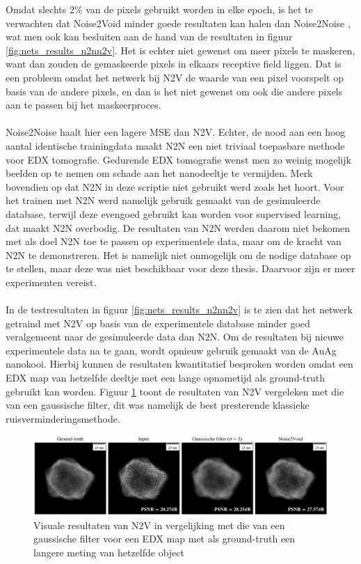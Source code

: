 \documentclass{report}
\begin{document}
Omdat slechts $2\%$ van de pixels gebruikt worden in elke epoch, is het te verwachten dat Noise2Void minder goede resultaten kan halen dan Noise2Noise \cite{paper:n2v}, wat men ook kan besluiten aan de hand van de resultaten in figuur \ref{fig:nets_results_n2nn2v}. Het is echter niet gewenst om meer pixels te maskeren, want dan zouden de gemaskeerde pixels in elkaars receptive field liggen. Dat is een probleem omdat het netwerk bij N2V de waarde van een pixel voorspelt op basis van de andere pixels, en dan is het niet gewenst om ook die andere pixels aan te passen bij het maskeerproces.
\\ \\
Noise2Noise haalt hier een lagere MSE dan N2V. Echter, de nood aan een hoog aantal identische trainingdata maakt N2N een niet triviaal toepasbare methode voor EDX tomografie. Gedurende EDX tomografie wenst men zo weinig mogelijk beelden op te nemen om schade aan het nanodeeltje te vermijden. Merk bovendien op dat N2N in deze scriptie niet gebruikt werd zoals het hoort. Voor het trainen met N2N werd namelijk gebruik gemaakt van de gesimuleerde database, terwijl deze evengoed gebruikt kan worden voor supervised learning, dat maakt N2N overbodig. De resultaten van N2N werden daarom niet bekomen met als doel N2N toe te passen op experimentele data, maar om de kracht van N2N te demonstreren. Het is namelijk niet onmogelijk om de nodige database op te stellen, maar deze was niet beschikbaar voor deze thesis. Daarvoor zijn er meer experimenten vereist. 
\\ \\
In de testresultaten in figuur \ref{fig:nets_results_n2nn2v} is te zien dat het netwerk getraind met N2V op basis van de experimentele database minder goed veralgemeent naar de gesimuleerde data dan N2N. Om de resultaten bij nieuwe experimentele data na te gaan, wordt opnieuw gebruik gemaakt van de AuAg nanokooi. Hierbij kunnen de resultaten kwantitatief besproken worden omdat een EDX map van hetzelfde deeltje met een lange opnametijd als ground-truth gebruikt kan worden. Figuur \ref{fig:nets_n2v_vis_edx} toont de resultaten van N2V vergeleken met die van een gaussische filter, dit was namelijk de best presterende klassieke ruisverminderingsmethode.
\begin{figure}[h!]
	\centering
	\includegraphics[width=15cm]{images/nets/n2v_vis_edx.png}
	\caption{Visuale resultaten van N2V in vergelijking met die van een gaussische filter voor een EDX map met als ground-truth een langere meting van hetzelfde object}
	\label{fig:nets_n2v_vis_edx}
\end{figure}
\end{document}
